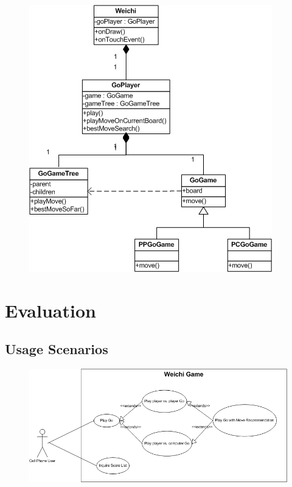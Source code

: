 \documentclass[acmtocl]{acmtrans2m}
\begin{document}
\begin{figure}[t]
 \centering
 \includegraphics[width = \linewidth]{fig/class}
 \label{fig:class}
\end{figure}


\section{Evaluation}

\subsection{Usage Scenarios}

\begin{figure}[t]
 \centering
 \includegraphics[width = \linewidth]{fig/user_case}
 \label{fig:use}
\end{figure}
\end{document}
